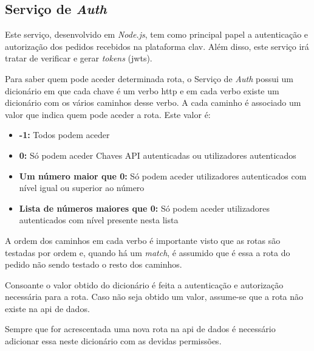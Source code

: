 \subsection{Serviço de \textit{Auth}}
Este serviço, desenvolvido em \textit{Node.js}, tem como principal papel a autenticação e autorização dos pedidos recebidos na plataforma \acrshort{clav}. Além disso, este serviço irá tratar de verificar e gerar \textit{tokens} (\acrshort{jwt}s). 

Para saber quem pode aceder determinada rota, o Serviço de \textit{Auth} possui um dicionário em que cada chave é um verbo \acrshort{http} e em cada verbo existe um dicionário com os vários caminhos desse verbo. A cada caminho é associado um valor que indica quem pode aceder a rota. Este valor é:
\begin{itemize}
    \item \textbf{-1:} Todos podem aceder
    \item \textbf{0:} Só podem aceder Chaves API autenticadas ou utilizadores autenticados
    \item \textbf{Um número maior que 0:} Só podem aceder utilizadores autenticados com nível igual ou superior ao número
    \item \textbf{Lista de números maiores que 0:} Só podem aceder utilizadores autenticados com nível presente nesta lista
\end{itemize}
A ordem dos caminhos em cada verbo é importante visto que as rotas são testadas por ordem e, quando há um \textit{match}, é assumido que é essa a rota do pedido não sendo testado o resto dos caminhos.

Consoante o valor obtido do dicionário é feita a autenticação e autorização necessária para a rota. Caso não seja obtido um valor, assume-se que a rota não existe na \acrshort{api} de dados.

Sempre que for acrescentada uma nova rota na \acrshort{api} de dados é necessário adicionar essa neste dicionário com as devidas permissões.

